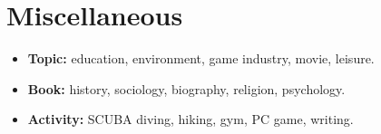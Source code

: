 \documentclass[a4paper, 11pt]{article}
\newcommand{\resumeItem}[2]{
    \item\small{
        \textbf{#1}{#2 \vspace{-2pt}}
    }
}
\newcommand{\resumeItemListStart}{\begin{itemize}[leftmargin=*]\setlength\itemsep{0em}\vspace{-1pt}}
\newcommand{\resumeItemListEnd}{\end{itemize}\vspace{-5pt}}
\begin{document}
    \vspace{-20pt}
    \section{Miscellaneous}

    \resumeItemListStart
    \resumeItem{Topic:}{ education, environment, game industry, movie, leisure.}
    \resumeItem{Book:}{ history, sociology, biography, religion, psychology.}
    \resumeItem{Activity:}{ SCUBA diving, hiking, gym, PC game, writing.}
    \resumeItemListEnd
\end{document}
